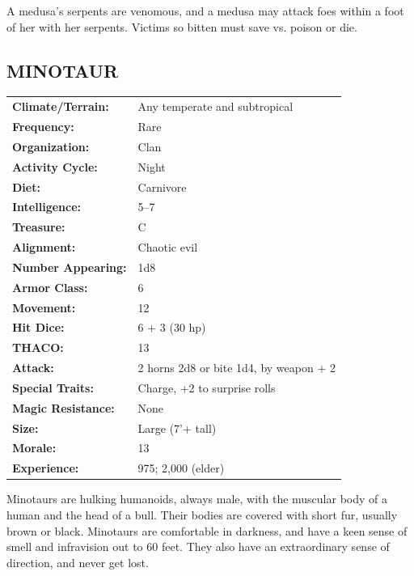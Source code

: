 \begin{multicols}{2}
A medusa's serpents are venomous, and a medusa may attack foes within a foot of her with her serpents. Victims so bitten must save vs. poison or die.

\noindent
\begin{minipage}{\columnwidth}

\vspace{1em}

\subsection{MINOTAUR}

\noindent \begin{tabular}{p{}p{}}
\textbf{Climate/Terrain:}	& Any temperate and subtropical	\\
\textbf{Frequency:} 		& Rare	\\
\textbf{Organization:} 		& Clan	\\
\textbf{Activity Cycle:} 	& Night	\\
\textbf{Diet:} 				& Carnivore	\\
\textbf{Intelligence:} 		& 5--7	\\
\textbf{Treasure:} 			& C	\\
\textbf{Alignment:} 		& Chaotic evil	\\
\hline
\textbf{Number Appearing:} 	& 1d8	\\
\textbf{Armor Class:} 		& 6	\\
\textbf{Movement:} 			& 12	\\
\textbf{Hit Dice:} 			& 6 + 3 (30 hp)	\\
\textbf{THACO:} 			& 13	\\
\textbf{Attack:} 			& 2 horns 2d8 or bite 1d4, by weapon + 2	\\
\textbf{Special Traits:} & Charge, +2 to surprise rolls	\\
\textbf{Magic Resistance:} 	& None	\\
\textbf{Size:} 				& Large (7'+ tall)	\\
\textbf{Morale:} 			& 13	\\
\textbf{Experience:} 		& 975; 2,000 (elder)	\\ %
\end{tabular}

\end{minipage}

Minotaurs are hulking humanoids, always male, with the muscular body of a human and the head of a bull. Their bodies are covered with short fur, usually brown or black. Minotaurs are comfortable in darkness, and have a keen sense of smell and infravision out to 60 feet. They also have an extraordinary sense of direction, and never get lost.


\end{multicols}
